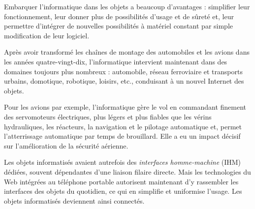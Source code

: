 \begin{tcolorbox}[title={Introduction}, toprule=0pt, leftrule=0pt, rightrule=0pt, arc=0pt,
                  fonttitle=\scshape\boxtitlefont,
                  colbacktitle=white, coltitle=firstcolor, colframe=firstcolor, colback=firstcolor!10,
                  breakable, enhanced jigsaw]


Embarquer l’informatique dans les objets a beaucoup d’avantages : simplifier leur fonctionnement, leur donner plus de possibilités d’usage et de sûreté et, leur permettre d’intégrer de nouvelles possibilités à matériel constant par simple modification de leur logiciel.

Après avoir transformé les chaînes de montage des automobiles et les avions dans les années quatre-vingt-dix, l’informatique intervient maintenant dans des domaines toujours plus nombreux : automobile, réseau ferroviaire et transports urbains, domotique, robotique, loisirs, etc., conduisant à un nouvel Internet des objets.

Pour les avions par exemple, l’informatique gère le vol en commandant finement des servomoteurs électriques, plus légers et plus fiables que les vérins hydrauliques, les réacteurs, la navigation et le pilotage automatique et, permet l’atterrissage automatique par temps de brouillard. Elle a eu un impact décisif sur l’amélioration de la sécurité aérienne.

Les objets informatisés avaient autrefois des \textit{interfaces homme-machine} (IHM) dédiées, souvent dépendantes d’une liaison filaire directe. Mais les technologies du Web intégrées au téléphone portable autorisent maintenant d’y rassembler les interfaces des objets du quotidien, ce qui en simplifie et uniformise l’usage. Les objets informatisés deviennent ainsi connectés.
\end{tcolorbox}

